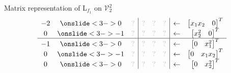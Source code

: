 \documentclass[10pt,T]{beamer}
\newcommand{\transparent}[1]{\textcolor{lightgray}{#1}}
\begin{document}
\begin{frame}[b]{Matrix representation of L$_{f_1}$ on $\mathcal{V}_2^2$}
\begin{equation*}
\begin{array}{ccc|ccc|cc}
    -2&\onslide<3->{0}&\transparent{?}&\transparent{?}&\transparent{?}&\transparent{?}&\leftarrow&\begin{bmatrix}x_1x_2&0\end{bmatrix}^T\\
    0&\onslide<3->{-1}&\transparent{?}&\transparent{?}&\transparent{?}&\transparent{?}&\leftarrow&\begin{bmatrix}x_2^2&0\end{bmatrix}^T\\\hline
    -1&\onslide<3->{0}&\transparent{?}&\transparent{?}&\transparent{?}&\transparent{?}&\leftarrow&\begin{bmatrix}0&x_1^2\end{bmatrix}^T\\
    0&\onslide<3->{-1}&\transparent{?}&\transparent{?}&\transparent{?}&\transparent{?}&\leftarrow&\begin{bmatrix}0&x_1x_2\end{bmatrix}^T\\
    0&\onslide<3->{0}&\transparent{?}&\transparent{?}&\transparent{?}&\transparent{?}&\leftarrow&\begin{bmatrix}0&x_2^2\end{bmatrix}^T
    \end{array}
\end{equation*}
\end{frame}
\end{document}
